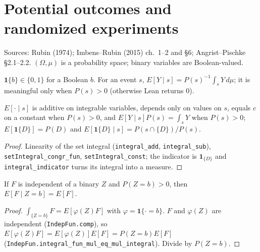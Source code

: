 \section{Potential outcomes and randomized experiments}
\label{sec:potential-outcomes}

Sources: Rubin (1974); Imbens--Rubin (2015) ch.~1--2 and \S6; Angrist--Pischke \S2.1--2.2.
$(\Omega, \mu)$ is a probability space; binary variables are Boolean-valued.

\begin{definition}
\label{def:condmean}
\leanok
$\mathbf 1\{b\} \in \{0,1\}$ for a Boolean $b$. For an event $s$,
$E[Y \mid s] = P(s)^{-1}\int_s Y\,d\mu$; it is meaningful only when $P(s) > 0$ (otherwise Lean returns $0$).
\end{definition}

\begin{lemma}
\label{lem:condmean-calculus}
\leanok
{}
$E[\cdot \mid s]$ is additive on integrable variables, depends only on values on $s$, equals $c$ on a constant
when $P(s)>0$, and $E[Y\mid s]P(s) = \int_s Y$ when $P(s) > 0$; $E[\mathbf 1\{D\}] = P(D)$ and
$E[\mathbf 1\{D\}\mid s] = P(s \cap \{D\})/P(s)$.
\end{lemma}
\begin{proof}
\leanok
Linearity of the set integral (\texttt{integral\_add}, \texttt{integral\_sub}), \texttt{setIntegral\_congr\_fun},
\texttt{setIntegral\_const}; the indicator is $\mathbf 1_{\{D\}}$ and \texttt{integral\_indicator} turns its
integral into a measure.
\end{proof}

\begin{theorem}
\label{thm:indep-condmean}
\leanok
{}
If $F$ is independent of a binary $Z$ and $P(Z = b) > 0$, then $E[F \mid Z = b] = E[F]$.
\end{theorem}
\begin{proof}
\leanok
$\int_{\{Z=b\}} F = E[\varphi(Z) F]$ with $\varphi = \mathbf 1\{\cdot = b\}$. $F$ and $\varphi(Z)$ are independent
(\texttt{IndepFun.comp}), so $E[\varphi(Z)F] = E[\varphi(Z)]E[F] = P(Z=b)E[F]$
(\texttt{IndepFun.integral\_fun\_mul\_eq\_mul\_integral}). Divide by $P(Z = b)$.
\end{proof}

